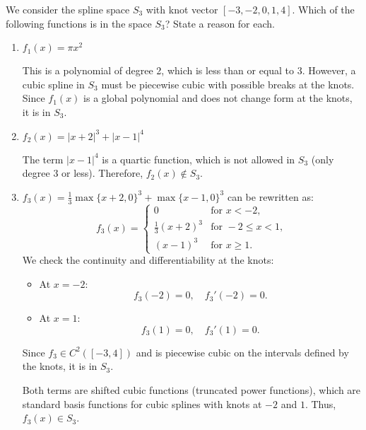 We consider the spline space \( S_3 \) with knot vector \([-3, -2, 0, 1, 4]\). Which of the following functions is in the space \( S_3 \)? State a reason for each.

\begin{enumerate}[label=(\alph*)]
    \item \( f_1(x) = \pi x^2 \)

          This is a polynomial of degree 2, which is less than or equal to 3. However, a cubic spline in \( S_3 \) must be piecewise cubic with possible breaks at the knots. Since \( f_1(x) \) is a global polynomial and does not change form at the knots, it is in \( S_3 \).

    \item \( f_2(x) = |x+2|^3 + |x-1|^4 \)

          The term \( |x-1|^4 \) is a quartic function, which is not allowed in \( S_3 \) (only degree 3 or less). Therefore, \( f_2(x) \notin S_3 \).

    \item \( f_3(x) = \frac{1}{3} \max\{x+2,0\}^3 + \max\{x-1,0\}^3 \) can be rewritten as:
          \[
              f_3(x) =
              \begin{cases}
                  0                  & \text{for } x < -2,        \\
                  \frac{1}{3}(x+2)^3 & \text{for } -2 \leq x < 1, \\
                  (x-1)^3            & \text{for } x \geq 1.
              \end{cases}
          \]
          We check the continuity and differentiability at the knots:
          \begin{itemize}
              \item At \( x = -2 \):
                    \[
                        f_3(-2) = 0, \quad f_3'(-2) = 0.
                    \]
              \item At \( x = 1 \):
                    \[
                        f_3(1) = 0, \quad f_3'(1) = 0.
                    \]
          \end{itemize}
          Since \( f_3 \in C^2([-3, 4]) \) and is piecewise cubic on the intervals defined by the knots, it is in \( S_3 \).

          Both terms are shifted cubic functions (truncated power functions), which are standard basis functions for cubic splines with knots at \(-2\) and \(1\). Thus, \( f_3(x) \in S_3 \).


\end{enumerate}
